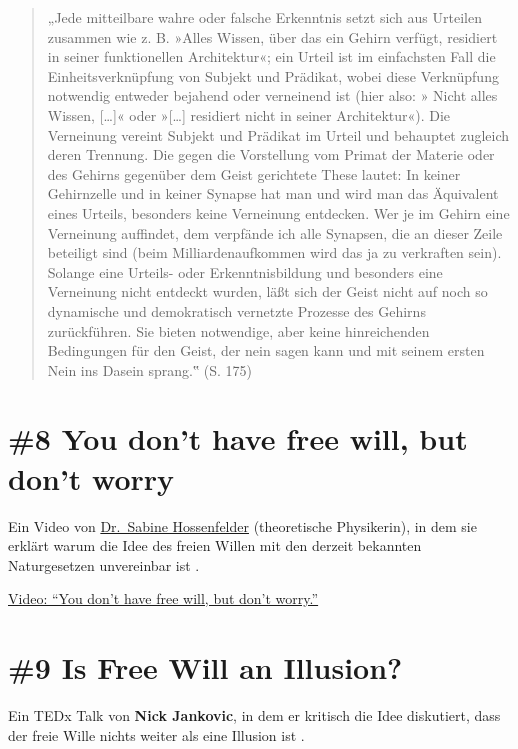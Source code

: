 \documentclass[
  a4paper,
]{report}
\begin{document}
\begin{quote}
„Jede mitteilbare wahre oder falsche Erkenntnis setzt sich aus Urteilen zusammen wie z. B. »Alles Wissen, über das ein Gehirn verfügt, residiert in seiner funktionellen Architektur«; ein Urteil ist im einfachsten Fall die Einheitsverknüpfung von Subjekt und Prädikat, wobei diese Verknüpfung notwendig entweder bejahend oder verneinend ist (hier also: » Nicht alles Wissen, {[}\ldots{]}« oder »{[}\ldots{]} residiert nicht in seiner Architektur«). Die Verneinung vereint Subjekt und Prädikat im Urteil und behauptet zugleich deren Trennung. Die gegen die Vorstellung vom Primat der Materie oder des Gehirns gegenüber dem Geist gerichtete These lautet: In keiner Gehirnzelle und in keiner Synapse hat man und wird man das Äquivalent eines Urteils, besonders keine Verneinung entdecken. Wer je im Gehirn eine Verneinung auffindet, dem verpfände ich alle Synapsen, die an dieser Zeile beteiligt sind (beim Milliardenaufkommen wird das ja zu verkraften sein). Solange eine Urteils- oder Erkenntnisbildung und besonders eine Verneinung nicht entdeckt wurden, läßt sich der Geist nicht auf noch so dynamische und demokratisch vernetzte Prozesse des Gehirns zurückführen. Sie bieten notwendige, aber keine hinreichenden Bedingungen für den Geist, der nein sagen kann und mit seinem ersten Nein ins Dasein sprang.‟ (S. 175)
\end{quote}

\hypertarget{def-ev8}{%
\section{\#8 You don't have free will, but don't worry}\label{def-ev8}}

Ein Video von \href{https://sabinehossenfelder.com}{Dr.~Sabine Hossenfelder} (theoretische Physikerin), in dem sie erklärt warum die Idee des freien Willen mit den derzeit bekannten Naturgesetzen unvereinbar ist \citep{Hossenfelder2020}.

\href{https://www.youtube.com/watch?v=zpU_e3jh_FY}{Video: ``You don't have free will, but don't worry.''}

\hypertarget{def-ev9}{%
\section{\#9 Is Free Will an Illusion?}\label{def-ev9}}

Ein TEDx Talk von \textbf{Nick Jankovic}, in dem er kritisch die Idee diskutiert, dass der freie Wille nichts weiter als eine Illusion ist \citep{Jankovic2021}.
\end{document}

